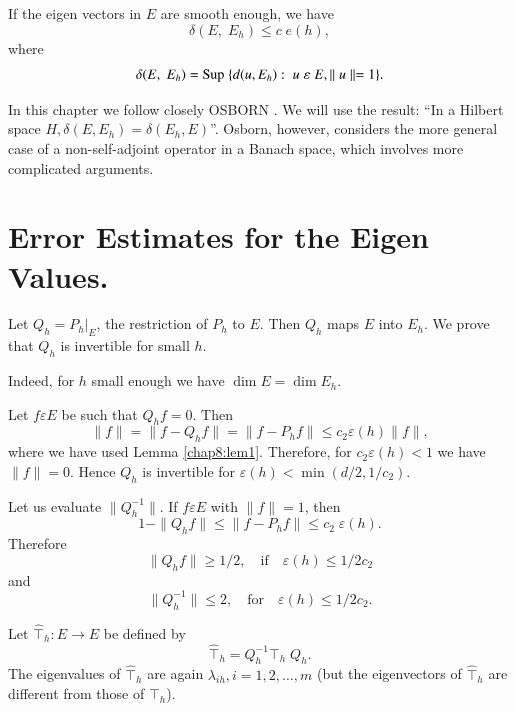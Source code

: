 \begin{lem}\label{chap8:lem2}
If the eigen vectors in $E$ are smooth enough, we have 
\begin{equation}\label{chap8:eq8.15}
\delta(E,\;E_h)\leq c\;e(h),
\end{equation}\pageoriginale
where
$$
\delta(E,\;E_h)=\operatorname{Sup}\;\{d(u,E_h):\;u\;\varepsilon \;E,\parallel
u\parallel=1\}.
$$
\end{lem}

\begin{Remark}\label{chap8:Rem1}
In this chapter we follow closely OSBORN \cite{key34}. We will use the result:
``In a Hilbert space $H, \delta(E, E_h)=\delta(E_h, E)$''. Osborn,
however, considers the more general case of a non-self-adjoint
operator in a Banach space, which involves more complicated arguments.
\end{Remark}

\section{Error Estimates for the Eigen Values.} \label{chap8:sec6}
Let $Q_h=P_h|_E$, the restriction of $P_h$ to $E$. Then $Q_h$ maps $E$
into $E_h$. We prove that $Q_h$ is invertible for small $h$.

Indeed, for $h$ small enough we have $\dim E= \dim E_h$.

Let $f\varepsilon E$ be such that $Q_hf=0$. Then
$$
\parallel f\parallel =\parallel f-Q_hf\parallel =\parallel f-P_hf \parallel
\leq c_2\varepsilon(h)\parallel f\parallel,
$$
where we have used Lemma \ref{chap8:lem1}. Therefore, for $c_2
\varepsilon(h)<1$ we have $\parallel f\parallel=0$. Hence $Q_h$ is
invertible for $\varepsilon(h)<\min(d/2, 1/c_2)$. 

Let us evaluate $\parallel Q_h^{-1}\parallel$. If $f\varepsilon E$ with
$\parallel f\parallel =1$, then
$$
1-\parallel Q_hf\parallel \leq \parallel f-P_hf\parallel \leq c_2
\;\varepsilon(h).
$$
Therefore
$$
\parallel Q_hf\parallel \geq 1/2,\quad\text{if}\quad\varepsilon(h)
\leq 1/2c_2
$$\pageoriginale
and
$$
\parallel Q_h^{-1}\parallel \leq 2,\quad\text{for}\quad\varepsilon
(h)\leq 1/2c_2.
$$

Let $\hat{\top}_h:E\to E$ be defined by
$$
\hat{\top}_h=Q_h^{-1}\top_h\;Q_h.
$$
The eigenvalues of $\hat{\top}_h$ are again $\lambda_{ih}, i=1,
2,\ldots,m$ (but the eigenvectors of $\hat{\top}_h$ are different from
those of $\top_h$).

